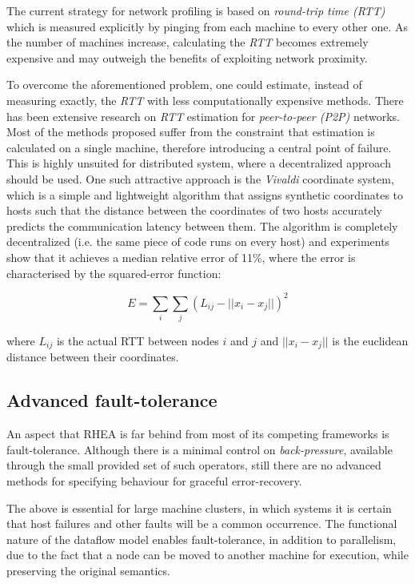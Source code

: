 \documentclass[sigplan,review,anonymous]{acmart}\settopmatter{printfolios=true,printacmref=false}
\begin{document}
The current strategy for network profiling is based on \textit{round-trip time (RTT)} which is measured explicitly by pinging from each machine to every other one. As the number of machines increase, calculating the \textit{RTT} becomes extremely expensive and may outweigh the benefits of exploiting network proximity.

To overcome the aforementioned problem, one could estimate, instead of measuring exactly, the \textit{RTT} with less computationally expensive methods. There has been extensive research on \textit{RTT} estimation for \textit{peer-to-peer (P2P)} networks\cite{rtt_survey}. Most of the methods proposed suffer from the constraint that estimation is calculated on a single machine, therefore introducing a central point of failure. This is highly unsuited for distributed system, where a decentralized approach should be used. One such attractive approach is the \textit{Vivaldi} coordinate system\cite{vivaldi}, which is a simple and lightweight algorithm that assigns synthetic coordinates to hosts such that the distance between the coordinates of two hosts accurately predicts the communication latency between them. The algorithm is completely decentralized (i.e. the same piece of code runs on every host) and experiments show that it achieves a median relative error of 11\%, where the error is characterised by the squared-error function:

\[ E =  \sum_i \sum_j (L_{ij}-||x_i - x_j||)^2  \]

where $L_{ij}$ is the actual RTT between nodes $i$ and $j$ and $||x_i - x_j||$ is the euclidean distance between their coordinates.

\subsection{Advanced fault-tolerance}

An aspect that \textsc{RHEA} is far behind from most of its competing frameworks is fault-tolerance. Although there is a minimal control on \textit{back-pressure}, available through the small provided set of such operators, still there are no advanced methods for specifying behaviour for graceful error-recovery.

The above is essential for large machine clusters, in which systems it is certain that host failures and other faults will be a common occurrence. The functional nature of the dataflow model enables fault-tolerance, in addition to parallelism, due to the fact that a node can be moved to another machine for execution, while preserving the original semantics.
\end{document}
